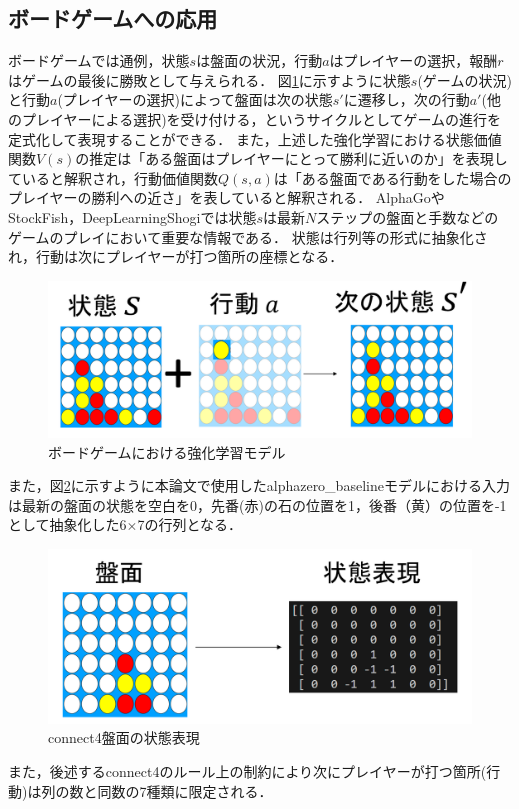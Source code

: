 \subsection{ボードゲームへの応用}
ボードゲームでは通例，状態$s$は盤面の状況，行動$a$はプレイヤーの選択，報酬$r$はゲームの最後に勝敗として与えられる．
図\ref{fig:board-game-model}に示すように状態$s$(ゲームの状況)と行動$a$(プレイヤーの選択)によって盤面は次の状態$s'$に遷移し，次の行動$a'$(他のプレイヤーによる選択)を受け付ける，というサイクルとしてゲームの進行を定式化して表現することができる．
また，上述した強化学習における状態価値関数$V(s)$の推定は「ある盤面はプレイヤーにとって勝利に近いのか」を表現していると解釈され，行動価値関数$Q(s, a)$は「ある盤面である行動をした場合のプレイヤーの勝利への近さ」を表していると解釈される．
AlphaGo\cite{AlphaGo}やStockFish\cite{StockFish12}，DeepLearningShogi\cite{dlshogi}では状態$s$は最新$N$ステップの盤面と手数などのゲームのプレイにおいて重要な情報である．
状態は行列等の形式に抽象化され，行動は次にプレイヤーが打つ箇所の座標となる．
\begin{figure}[htbp]
	\includegraphics[width=\linewidth]{./figure/transition.png}
	\caption{ボードゲームにおける強化学習モデル}
	\label{fig:board-game-model}
\end{figure}

また，図\ref{fig:connect4-symbol}に示すように本論文で使用したalphazero\_baselineモデル\cite{baseline}における入力は最新の盤面の状態を空白を0，先番(赤)の石の位置を1，後番（黄）の位置を-1として抽象化した6$\times$7の行列となる．
\begin{figure}[htbp]
	\centering
	\includegraphics[width=\linewidth]{./figure/symbolic.png}
	\caption{connect4盤面の状態表現}
	\label{fig:connect4-symbol}
\end{figure}
また，後述するconnect4のルール上の制約により次にプレイヤーが打つ箇所(行動)は列の数と同数の7種類に限定される．

